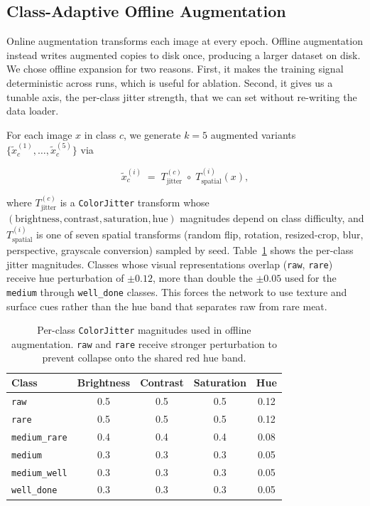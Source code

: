 \documentclass{article}
\begin{document}
\subsection{Class-Adaptive Offline Augmentation}
\label{sec:method-aug}

Online augmentation transforms each image at every epoch. Offline augmentation
instead writes augmented copies to disk once, producing a larger dataset on
disk. We chose offline expansion for two reasons. First, it makes the
training signal deterministic across runs, which is useful for ablation.
Second, it gives us a tunable axis, the per-class jitter strength, that
we can set without re-writing the data loader.

For each image $x$ in class $c$, we generate $k=5$ augmented variants
$\{\tilde{x}_c^{(1)}, \dots, \tilde{x}_c^{(5)}\}$ via

\begin{equation}
\tilde{x}_c^{(i)} \;=\; T_{\text{jitter}}^{(c)} \;\circ\; T_{\text{spatial}}^{(i)}(x),
\end{equation}

where $T_{\text{jitter}}^{(c)}$ is a \texttt{ColorJitter} transform whose
$(\text{brightness}, \text{contrast}, \text{saturation}, \text{hue})$
magnitudes depend on class difficulty, and $T_{\text{spatial}}^{(i)}$ is one of
seven spatial transforms (random flip, rotation, resized-crop, blur,
perspective, grayscale conversion) sampled by seed. Table~\ref{tab:jitter}
shows the per-class jitter magnitudes. Classes whose visual representations
overlap (\texttt{raw}, \texttt{rare}) receive hue perturbation of $\pm0.12$,
more than double the $\pm0.05$ used for the \texttt{medium} through
\texttt{well\_done} classes. This forces the network to use
texture and surface cues rather than the hue band that separates
raw from rare meat.

\begin{table}[t]
\caption{Per-class \texttt{ColorJitter} magnitudes used in offline augmentation.
\texttt{raw} and \texttt{rare} receive stronger perturbation to prevent
collapse onto the shared red hue band.}
\label{tab:jitter}
\begin{center}
\begin{tabular}{lcccc}
\toprule
\textbf{Class} & \textbf{Brightness} & \textbf{Contrast} & \textbf{Saturation} & \textbf{Hue} \\
\midrule
\texttt{raw}         & 0.5 & 0.5 & 0.5 & 0.12 \\
\texttt{rare}        & 0.5 & 0.5 & 0.5 & 0.12 \\
\texttt{medium\_rare}& 0.4 & 0.4 & 0.4 & 0.08 \\
\texttt{medium}      & 0.3 & 0.3 & 0.3 & 0.05 \\
\texttt{medium\_well}& 0.3 & 0.3 & 0.3 & 0.05 \\
\texttt{well\_done}  & 0.3 & 0.3 & 0.3 & 0.05 \\
\bottomrule
\end{tabular}
\end{center}
\end{table}
\end{document}
